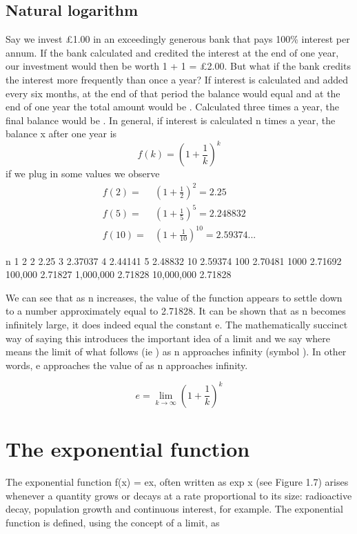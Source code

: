 \subsection{Natural logarithm}
Say we invest £1.00 in an exceedingly generous bank that pays 100\% interest per annum. If the bank calculated and credited the interest at the end of one year, our investment would then be worth 1 + 1 = £2.00. But what if the bank credits the interest more frequently than once a year? If interest is calculated and added every six months, at the end of that period the balance would equal and at the end of one year the total amount would be . Calculated three times a year, the final balance would be . In general, if interest is calculated n times a year, the balance x after one year is
\[
f(k) = \left(1 + \frac{1}{k}\right)^k
\]
if we plug in some values we observe
\[
\begin{align*}
  f(2)  =& \left(1 + \frac{1}{2}\right)^2 = 2.25 \\
  f(5)  =& \left(1 + \frac{1}{5}\right)^5 = 2.248832 \\
  f(10) =& \left(1 + \frac{1}{10}\right)^{10} = 2.59374...
\end{align*}
\]

n 1 2 2 2.25 3 2.37037 4 2.44141 5 2.48832 10 2.59374 100 2.70481 1000 2.71692 100,000 2.71827 1,000,000 2.71828 10,000,000 2.71828

We can see that as n increases, the value of the function appears to settle down to a number approximately equal to 2.71828. It can be shown that as n becomes infinitely large, it does indeed equal the constant e. The mathematically succinct way of saying this introduces the important idea of a limit and we say where means the limit of what follows (ie ) as n approaches infinity (symbol ). In other words, e approaches the value of as n approaches infinity.

\begin{equation}
e = \lim_{k\to\infty}\left(1 + \frac{1}{k}\right)^k
\end{equation}

\section{The exponential function}
The exponential function f(x) = ex, often written as exp x (see Figure 1.7) arises whenever a quantity grows or decays at a rate proportional to its size: radioactive decay, population growth and continuous interest, for example. The exponential function is defined, using the concept of a limit, as

